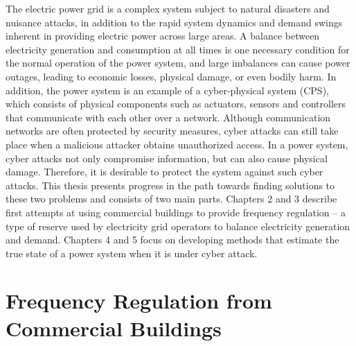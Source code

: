 \documentclass[../thesis.tex]{subfiles}
\begin{document}
The electric power grid is a complex system subject to natural disasters and nuisance attacks, in addition to the rapid system dynamics and demand swings inherent in providing electric power across large areas.
A balance between electricity generation and consumption at all times is one necessary condition for the normal operation of the power system, and large imbalances can cause power outages, leading to economic losses, physical damage, or even bodily harm.
In addition, the power system is an example of a cyber-physical system (CPS), which consists of physical components such as actuators, sensors and controllers that communicate with each other over a network. 
Although communication networks are often protected by security measures, cyber attacks can still take place when a malicious attacker obtains unauthorized access. %
In a power system, cyber attacks not only compromise information, but can also cause physical damage. 
Therefore, it is desirable to protect the system against such cyber attacks.
This thesis presents progress in the path towards finding solutions to these two problems and consists of two main parts.
Chapters 2 and 3 describe first attempts at using commercial buildings to provide frequency regulation -- a type of reserve used by electricity grid operators to balance electricity generation and demand. 
Chapters 4 and 5 focus on developing methods that estimate the true state of a power system when it is under cyber attack.




\section{Frequency Regulation from Commercial Buildings}
\end{document}

